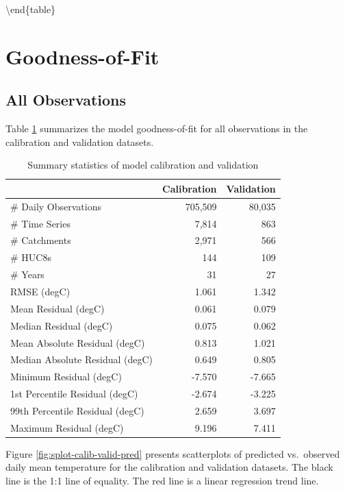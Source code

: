 \documentclass[
]{book}
\begin{document}
\textbackslash end\{table\}

\section{Goodness-of-Fit}\label{goodness-of-fit}

\subsection{All Observations}\label{all-observations}

Table \ref{tab:table-gof} summarizes the model goodness-of-fit for all observations in the calibration and validation datasets.

\begin{table}

\caption{\label{tab:table-gof}Summary statistics of model calibration and validation}
\centering
\begin{tabular}[t]{l|r|r}
\hline
 & Calibration & Validation\\
\hline
\# Daily Observations & 705,509 & 80,035\\
\hline
\# Time Series & 7,814 & 863\\
\hline
\# Catchments & 2,971 & 566\\
\hline
\# HUC8s & 144 & 109\\
\hline
\# Years & 31 & 27\\
\hline
RMSE (degC) & 1.061 & 1.342\\
\hline
Mean Residual (degC) & 0.061 & 0.079\\
\hline
Median Residual (degC) & 0.075 & 0.062\\
\hline
Mean Absolute Residual (degC) & 0.813 & 1.021\\
\hline
Median Absolute Residual (degC) & 0.649 & 0.805\\
\hline
Minimum Residual (degC) & -7.570 & -7.665\\
\hline
1st Percentile Residual (degC) & -2.674 & -3.225\\
\hline
99th Percentile Residual (degC) & 2.659 & 3.697\\
\hline
Maximum Residual (degC) & 9.196 & 7.411\\
\hline
\end{tabular}
\end{table}

Figure \ref{fig:splot-calib-valid-pred} presents scatterplots of predicted vs.~observed daily mean temperature for the calibration and validation datasets. The black line is the 1:1 line of equality. The red line is a linear regression trend line.
\end{document}
